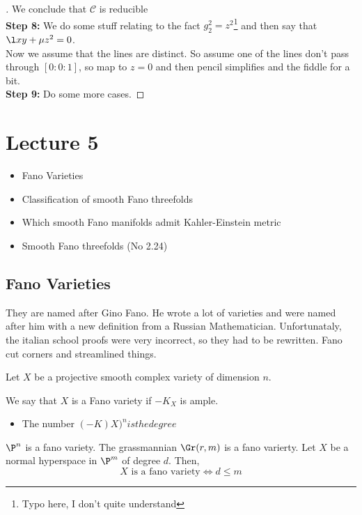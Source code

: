 \documentclass{article}
\begin{document}
\begin{proof}[]
  We conclude that $\mathcal{C}$ is reducible\\

  \textbf{Step 8:} We do some stuff relating to the fact $g_2^2 = z^2$\footnote{Typo here, I don't quite understand} and then say that $\l xy + \mu z^2 = 0$.\\
  Now we assume that the lines are distinct. So assume one of the lines don't pass through $[0 : 0 : 1]$, so map to $z = 0$ and then pencil simplifies and the fiddle for a bit.\\
  \textbf{Step 9:} Do some more cases.
\end{proof}

\newpage
\section{Lecture 5}
\begin{itemize}
  \item Fano Varieties
  \item Classification of smooth Fano threefolds
  \item Which smooth Fano manifolds admit Kahler-Einstein metric
  \item Smooth Fano threefolds (No 2.24)
\end{itemize}

\subsection{Fano Varieties}
They are named after Gino Fano. He wrote a lot of varieties and were named after him with a new definition from a Russian Mathematician. Unfortunataly, the italian school proofs were very incorrect, so they had to be rewritten. Fano cut corners and streamlined things.

  Let $X$ be a projective smooth complex variety of dimension $n$.

\begin{ndefi}
  We say that $X$ is a Fano variety if $-K_X$ is ample.
  \begin{itemize}
    \item The number $(-K)X)^n is the degree$
  \end{itemize}
\end{ndefi}

$\P^n$ is a fano variety. The grassmannian $\Gr(r, m)$ is a fano varierty. Let $X$ be a normal hyperspace in $\P^m$ of degree $d$. Then,
$$ \text{$X$ is a fano variety} \iff d \le m $$
\end{document}
